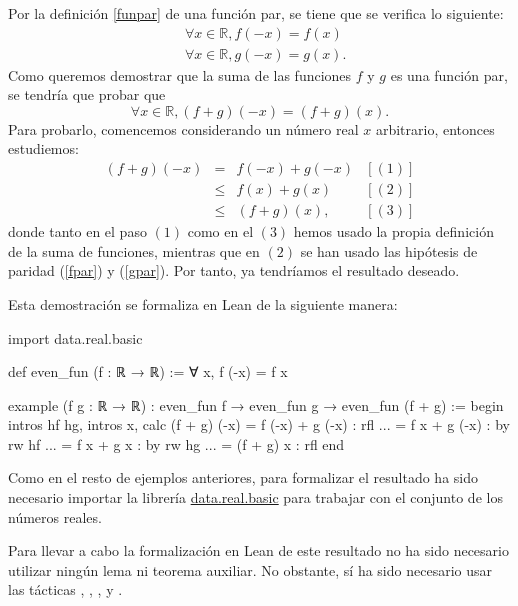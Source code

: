 \begin{demostracion}
  Por la definición \ref{funpar} de una función par, se tiene que se
  verifica lo siguiente:
  \begin{align}
    & ∀ x ∈ ℝ, f(-x)=f(x)  \label{fpar} \\
    & ∀ x ∈ ℝ, g(-x)=g(x). \label{gpar}
  \end{align}
  Como queremos demostrar que la suma de las funciones \(f\) y \(g\) es
  una función par, se tendría que probar que
  \begin{equation}
    ∀ x ∈ ℝ, (f+g)(-x) = (f+g)(x).
  \end{equation}
  Para probarlo, comencemos considerando un número real \(x\) arbitrario,
  entonces estudiemos:
  \[\begin{array}{llll}
      (f+g)(-x) &= &f(-x)+g(-x) & [(1)]\\
                &≤ &f(x)+g(x)   & [(2)] \\
                &≤ &(f+g)(x),   & [(3)]
    \end{array}\]
  donde tanto en el paso \((1)\) como en el \((3)\) hemos usado la
  propia definición de la suma de funciones, mientras que en \((2) \) se
  han usado las hipótesis de paridad (\ref{fpar}) y (\ref{gpar}). Por
  tanto, ya tendríamos el resultado deseado.
\end{demostracion}

Esta demostración se formaliza en Lean de la siguiente manera:
\begin{leancode}
import data.real.basic

def even_fun (f : ℝ → ℝ) := ∀ x, f (-x) = f x

example
  (f g : ℝ → ℝ)
  : even_fun f → even_fun g →  even_fun (f + g) :=
begin
  intros hf hg,
  intros x,
  calc (f + g) (-x)
      = f (-x) + g (-x) : rfl
  ... = f x + g (-x)    : by rw hf
  ... = f x + g x       : by rw hg
  ... = (f + g) x       : rfl
end
\end{leancode}

Como en el resto de ejemplos anteriores, para formalizar el resultado ha sido
necesario importar la librería  \href{https://github.com/leanprover-community/mathlib/blob/master/src/data/real/basic.lean}{data.real.basic}
para trabajar con el conjunto de los números reales.

Para llevar a cabo la formalización en Lean de este resultado no ha sido
necesario utilizar ningún lema ni teorema auxiliar. No obstante, sí ha sido
necesario usar las tácticas
,
,
,
 y
.

